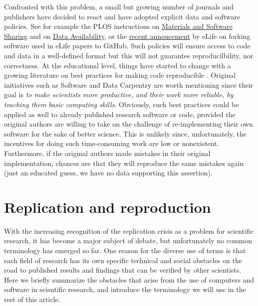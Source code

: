 \documentclass[a4paper,10pt, twocolumn]{article}
\begin{document}
Confronted with this problem, a small but growing number of journals and
publishers have decided to react and have adopted explicit data and software
policies. See for example the PLOS instructions on
\href{http://journals.plos.org/plosone/s/materials-and-software-sharing}{Materials
  and Software Sharing} and
on \href{http://journals.plos.org/plosone/s/data-availability}{Data Availability},
or the
\href{https://elifesciences.org/elife-news/inside-elife-forking-software-used-elife-papers-github}{recent
  annoucement} by eLife on forking software used in eLife papers to GitHub.
Such policies will ensure access to code and data in a well-defined format
\citep{perkel:2016} but this will not guarantee reproducilbility, nor
correctness. At the educational level, things have started to change with a
growing literature on best practices for making code reproducible
\citep{sandve:2013, crook:2013, wilson:2014, halchenko:2015, janz:2015,
  hinsen:2015}. Original initiatives such as Software and Data Carpentry
\citep{wilson:2016} are worth mentioning since their goal is {\em to make
  scientists more productive, and their work more reliable, by teaching them
  basic computing skills}. Obviously, such best practices could be applied as well to already published research software or code, provided the original
authors are willing to take on the challenge of re-implementing their own
software for the sake of better science. This is unlikely since, unfortunately, the
incentives for doing such time-consuming work are low or nonexistent.
Furthermore, if the original authors made mistakes in their original
implementation, chances are that they will reproduce the same mistakes again (just an educated guess, we have no data supporting this
assertion).\\



\section*{Replication and reproduction}
\label{sec:replication-reproduction}
With the increasing recognition of the replication crisis as a problem
for scientific research, it has become a major subject of debate, but
unfortunately no common terminology has emerged so far. One reason for
the diverse use of terms is that each field of research has its own
specific technical and social obstacles on the road to published
results and findings that can be verified by other scientists. Here we
briefly summarize the obstacles that arise from the use of computers
and software in scientific research, and introduce the terminology we
will use in the rest of this article.\\
\end{document}
